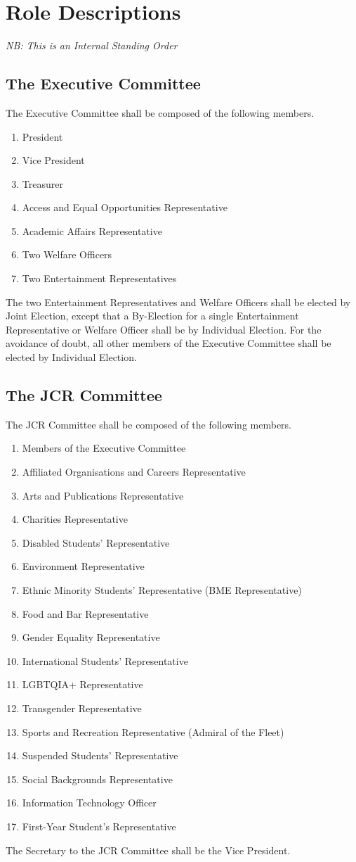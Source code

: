 \chapter{Role Descriptions}
\textit{NB: This is an Internal Standing Order}
\section{The Executive Committee}
\npara The Executive Committee shall be composed of the following members.
\begin{enumerate}
	\item President
	\item Vice President
	\item Treasurer
	\item Access and Equal Opportunities Representative
	\item Academic Affairs Representative
	\item Two Welfare Officers
	\item Two Entertainment Representatives
\end{enumerate}
\npara The two Entertainment Representatives and Welfare Officers shall be elected by Joint Election, except that a By-Election for a single Entertainment Representative or Welfare Officer shall be by Individual Election. For the avoidance of doubt, all other members of the Executive Committee shall be elected by Individual Election. 
\section{The JCR Committee}
\npara The JCR Committee shall be composed of the following members.
\begin{enumerate}
	\item Members of the Executive Committee
	\item Affiliated Organisations and Careers Representative
	\item Arts and Publications Representative
	\item Charities Representative
	\item Disabled Students' Representative
	\item Environment Representative
	\item Ethnic Minority Students' Representative (BME Representative)
	\item Food and Bar Representative
	\item Gender Equality Representative
	\item International Students' Representative
	\item LGBTQIA+ Representative
	\item Transgender Representative
	\item Sports and Recreation Representative (Admiral of the Fleet)
	\item Suspended Students' Representative
	\item Social Backgrounds Representative
	\item Information Technology Officer
    \item First-Year Student's Representative
\end{enumerate}
\npara The Secretary to the JCR Committee shall be the Vice President.
